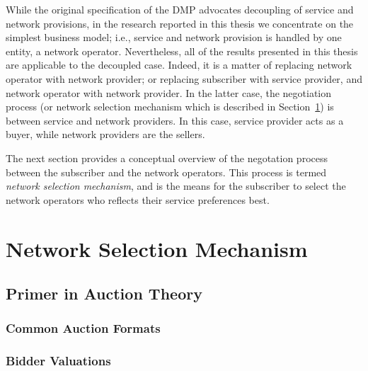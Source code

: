 While the original specification of the DMP advocates decoupling of service and network provisions, in the research reported in this thesis we concentrate on the simplest business model; i.e., service and network provision is handled by one entity, a network operator. Nevertheless, all of the results presented in this thesis are applicable to the decoupled case. Indeed, it is a matter of replacing network operator with network provider; or replacing subscriber with service provider, and network operator with network provider. In the latter case, the negotiation process (or network selection mechanism which is described in Section~\ref{sec:network_selection_mechanism_dmp}) is between service and network providers. In this case, service provider acts as a buyer, while network providers are the sellers.

The next section provides a conceptual overview of the negotation process between the subscriber and the network operators. This process is termed \emph{network selection mechanism}, and is the means for the subscriber to select the network operators who reflects their service preferences best.

\section{Network Selection Mechanism} %
\label{sec:network_selection_mechanism_dmp}

\subsection{Primer in Auction Theory} %
\label{sub:primer_in_auction_theory_dmp}

\subsubsection{Common Auction Formats} %
\label{ssub:common_auction_formats_dmp}


\subsubsection{Bidder Valuations} %
\label{ssub:bidder_valuations_dmp}


